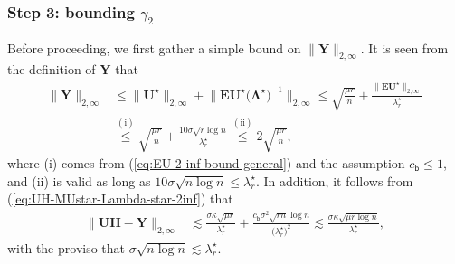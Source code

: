\subsubsection{Step 3: bounding $\gamma_2$}

Before proceeding, we first gather a simple bound on $\|\bm{Y}\|_{2,\infty}$.
It is seen from the definition of $\bm{Y}$ that
\begin{align}
\|\bm{Y}\|_{2,\infty} & \leq\big\|\bm{U}^{\star}\big\|_{2,\infty}+\big\|\bm{E}\bm{U}^{\star}\big(\bm{\Lambda}^{\star}\big)^{-1}\big\|_{2,\infty}\leq\sqrt{\frac{\mu r}{n}}+\frac{\big\|\bm{E}\bm{U}^{\star}\big\|_{2,\infty}}{\lambda_{r}^{\star}}\nonumber \\
 & \overset{(\mathrm{i})}{\leq}\sqrt{\frac{\mu r}{n}}+\frac{10\sigma\sqrt{r\log n}}{\lambda_{r}^{\star}}\overset{(\mathrm{ii})}{\leq}2\sqrt{\frac{\mu r}{n}},\label{eq:Y-2-inf-bound-123}
\end{align}
where (i) comes from (\ref{eq:EU-2-inf-bound-general}) and the assumption
$c_{\mathsf{b}}\leq1$, and (ii) is valid as long as $10\sigma\sqrt{n\log n}\leq\lambda_{r}^{\star}$.
In addition, it follows from (\ref{eq:UH-MUstar-Lambda-star-2inf})
that
\begin{align}
\big\|\bm{U}\bm{H}-\bm{Y}\big\|_{2,\infty} & \lesssim\frac{\sigma\kappa\sqrt{\mu r}}{\lambda_{r}^{\star}}+\frac{c_{\mathsf{b}}\sigma^{2}\sqrt{rn}\log n}{\big(\lambda_{r}^{\star}\big)^{2}}\lesssim\frac{\sigma\kappa\sqrt{\mu r\log n}}{\lambda_{r}^{\star}},\label{eq:UH-MUstar-Lambda-star-2inf-1}
\end{align}
with the proviso that $\sigma\sqrt{n\log n}\lesssim\lambda_{r}^{\star}$.





